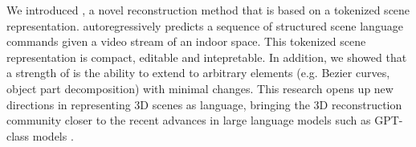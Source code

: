 We introduced \METHOD, a novel reconstruction method that is based on a tokenized scene representation. \METHOD{} autoregressively predicts a sequence of structured scene language commands given a video stream of an indoor space. This tokenized scene representation is compact, editable and intepretable. In addition, we showed that a strength of \METHOD{} is the ability to extend to arbitrary elements (e.g. Bezier curves, object part decomposition) with minimal changes. This research opens up new directions in representing 3D scenes as language, bringing the 3D reconstruction community closer to the recent advances in large language models such as GPT-class models \cite{openai2023gpt4}.